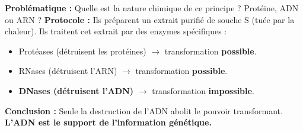 \documentclass[11pt]{article}
\begin{document}
\begin{experience}
\textbf{Problématique :} Quelle est la nature chimique de ce principe ? Protéine, ADN ou ARN ?
\textbf{Protocole :} Ils préparent un extrait purifié de souche S (tuée par la chaleur). Ils traitent cet extrait par des enzymes spécifiques :
\begin{itemize}
    \item Protéases (détruisent les protéines) $\rightarrow$ transformation \textbf{possible}.
    \item RNases (détruisent l'ARN) $\rightarrow$ transformation \textbf{possible}.
    \item \textbf{DNases (détruisent l'ADN)} $\rightarrow$ transformation \textbf{impossible}.
\end{itemize}
\textbf{Conclusion :} Seule la destruction de l'ADN abolit le pouvoir transformant. \textbf{L'ADN est le support de l'information génétique.}
\end{experience}
\end{document}
